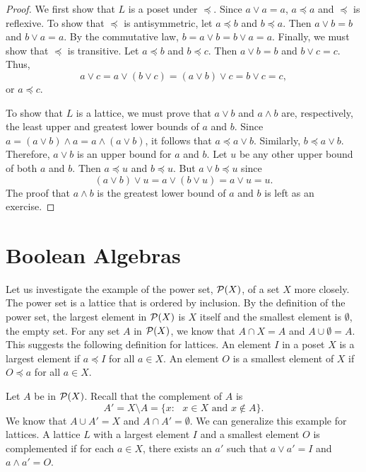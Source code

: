  
\begin{proof}
We first show that $L$ is a poset under $\preceq$. Since $a \vee a =
a$, $a \preceq a$ and $\preceq$ is reflexive. To show that $\preceq$
is antisymmetric, let $a \preceq b$ and $b \preceq a$. Then $a \vee b
= b$ and $b \vee a = a$.  By the commutative law, $b = a \vee b
= b \vee a = a$.   Finally, we must show that $\preceq$ is
transitive. Let $a \preceq b$ and $b \preceq c$. Then $a \vee b = b$
and $b \vee c = c$.  Thus,
\[
a \vee c = a \vee (b \vee c ) = ( a \vee b) \vee c = b \vee c = c,
\]
or $a \preceq c$.
 
To show that $L$ is a lattice, we must prove that $a \vee b$ and $a
\wedge b$ are, respectively, the least upper and greatest lower bounds
of $a$ and $b$. Since $a=(a \vee b) \wedge a = a \wedge (a \vee b)$,
it follows that $a \preceq a \vee b$.  Similarly, $b \preceq a \vee
b$. Therefore, $a \vee b$ is an upper bound for $a$ and $b$. Let $u$
be any other upper bound of both $a$ and $b$. Then $a \preceq u$ and
$b \preceq u$. But $a \vee b \preceq u$ since 
\[
(a \vee b) \vee u = a \vee (b \vee u) = a \vee u = u.
\]
The proof that $a \wedge b$ is the greatest lower bound of $a$ and
$b$ is left as an exercise.
\end{proof}
 
 
 
\section{Boolean Algebras}
 
 
Let us investigate the example of the power set, ${\cal P}(X)$, of a
set $X$ more  closely. The power set is a lattice that is  ordered by
inclusion. By the definition of the power set, the largest element in
${\cal P}(X)$ is $X$ itself and the smallest element is $\emptyset$,
the empty set. For any set $A$ in ${\cal P}(X)$, we know that $A \cap
X = A$ and $A \cup \emptyset = A$. This suggests the following
definition for lattices. An element $I$\label{notelargeposet} 
in a poset $X$ is a {\bfi
largest element\/} if $a \preceq I$ for
all $a \in X$.  An element $O$\label{notesmallposet} 
 is a  {\bfi smallest
element\/} of $X$ if $O \preceq a$ for
all $a \in X$.  
 
 
Let $A$ be in ${\cal P}(X)$. Recall that the complement of $A$ is
\[
A' = X \setminus A = \{ x : \mbox{ $x \in X$ and $x \notin A$}  \}.
\]
We know that $A \cup A' = X$ and $A \cap A' = \emptyset$. We can
generalize this example for lattices. A lattice $L$ with a largest
element $I$ and a smallest element $O$ is {\bfi
complemented\/} if for each $a \in X$, there
exists an $a'$\label{notedlatticecomp} 
such that $a \vee a' = I$ and $a \wedge a' = O$.
 
